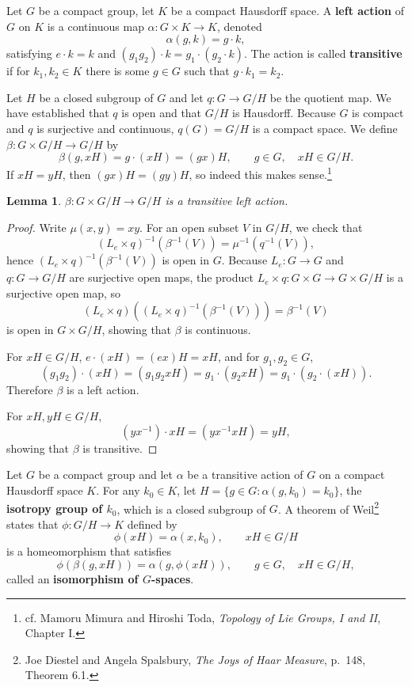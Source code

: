 \documentclass{article}
\newtheorem{lemma}[theorem]{Lemma}
\theoremstyle{definition}
\begin{document}
Let $G$ be a compact  group, let $K$ be a compact Hausdorff space. A \textbf{left action} of $G$ on $K$ is a continuous map
$\alpha:G \times K \to K$, denoted
\[
\alpha(g,k)=g\cdot k,
\]
 satisfying $e\cdot k = k$ and 
$(g_1g_2) \cdot k = g_1 \cdot (g_2 \cdot k)$. The action is called \textbf{transitive} if for $k_1,k_2 \in K$ there is some $g \in G$ such that
$g\cdot k_1=k_2$. 



Let $H$ be a closed subgroup of $G$ and let $q:G \to G/H$ be the quotient map.
We have established that $q$ is open and that $G/H$ is Hausdorff. 
Because
$G$ is compact and $q$ is surjective and continuous, $q(G)=G/H$ is a compact space. 
We define $\beta:G \times G/H \to G/H$ by
\[
\beta(g,xH) = g\cdot (xH) = (gx)H,\qquad g \in G,\quad xH \in G/H.
\]
If $xH=yH$, then $(gx)H=(gy)H$, so indeed this makes sense.\footnote{cf. 
Mamoru Mimura and Hiroshi Toda, {\em Topology of Lie Groups, I and II},
Chapter I.}


\begin{lemma}
$\beta:G \times G/H \to G/H$
is a transitive left action. 
\label{homogeneous}
\end{lemma}
\begin{proof}
Write $\mu(x,y)=xy$. 
For an open subset $V$ in $G/H$, we check that
\[
(L_e \times q)^{-1}(\beta^{-1}(V)) = \mu^{-1} (q^{-1}(V)),
\]
hence $(L_e \times q)^{-1}(\beta^{-1}(V))$ is open in $G$. 
Because $L_e:G \to G$ and $q:G \to G/H$ are surjective open maps, the product
$L_e \times q:G \times G \to G \times G/H$ is a surjective open map, so
\[
(L_e \times q)((L_e \times q)^{-1}(\beta^{-1}(V))) = \beta^{-1}(V)
\]
is open in $G \times G/H$, showing that $\beta$ is continuous. 

For $xH \in G/H$,  $e\cdot (xH) = (ex)H = xH$, and for $g_1,g_2 \in G$,
\[
(g_1 g_2) \cdot (xH) = (g_1g_2 xH) = g_1 \cdot (g_2 xH)
=g_1 \cdot (g_2 \cdot (xH)).
\]
Therefore $\beta$ is a left action. 

For $xH,yH \in G/H$, 
\[
(yx^{-1}) \cdot xH = (yx^{-1}xH) = yH,
\]
showing that $\beta$ is transitive.
\end{proof}


Let $G$ be a compact group and let $\alpha$ be a transitive action of $G$ on a
compact Hausdorff space $K$. For any $k_0 \in K$, let $H=\{g \in G: \alpha(g,k_0)=k_0\}$, the
\textbf{isotropy group of $k_0$}, which is a closed subgroup of $G$.
A theorem of Weil\footnote{Joe Diestel and Angela Spalsbury, {\em The Joys of Haar Measure},
p.~148, Theorem 6.1.} states that
$\phi:G/H \to K$ defined by
\[
\phi(xH) = \alpha(x,k_0),\qquad xH \in G/H
\]
is a homeomorphism that satisfies
\[
\phi ( \beta(g,xH)) = \alpha(g,\phi(xH)),\qquad g \in G,\quad xH \in G/H,
\]
called an \textbf{isomorphism of $G$-spaces}.
\end{document}
